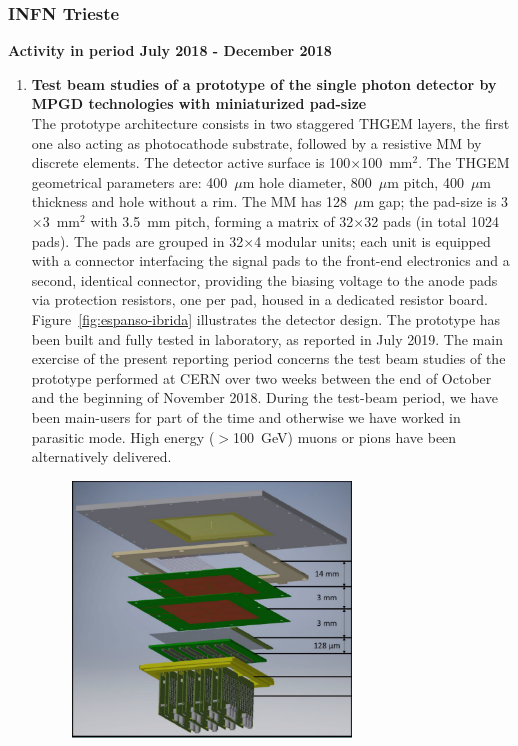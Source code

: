 \subsubsection{INFN Trieste} 
\label{sec:INFN-achieved}
\textbf{Activity in period 
July 2018 - December 2018}
\par
\begin{enumerate}
\item
\textbf{Test beam studies of a prototype of the single photon detector 
by MPGD technologies with miniaturized 
pad-size}\\
The prototype architecture consists in two 
staggered THGEM layers, the first one also acting 
as photocathode substrate, followed by a resistive MM 
by discrete elements. The detector active surface is 
100$\times$100~mm$^2$. The THGEM geometrical parameters 
are: 400~$\mu$m hole diameter, 800~$\mu$m pitch, 
400~$\mu$m thickness and hole without a rim.
The MM has 128~$\mu$m gap; the 
pad-size is 3$\times$3~mm$^2$ with 
3.5~mm pitch, forming a matrix  of 
32$\times$32 pads (in total 1024 pads). 
The pads are 
grouped in 32$\times$4  modular 
units; each unit is equipped with a 
connector interfacing the signal 
pads to the front-end electronics 
and a second, identical connector, 
providing the biasing voltage to the 
anode pads via protection resistors, 
one per pad, housed in a dedicated 
resistor board. Figure~\ref{fig:espanso-ibrida}
illustrates the detector design.
The prototype has been built
and fully tested in laboratory, as reported 
in July 2019. The main exercise of the present
reporting period concerns the test beam studies of
the prototype performed at CERN over  two weeks
between the end of October and the beginning
of November 2018. During the test-beam period, we have been main-users for part of the time and otherwise we have worked in parasitic mode. High energy ($>$100~GeV) muons or pions have been alternatively delivered.
\begin{figure}
			\begin{center}
		   		\includegraphics[width=0.7\textwidth]{INFN_plots/espanso-ibrida}

\end{center}
\end{figure}
\end{enumerate}
